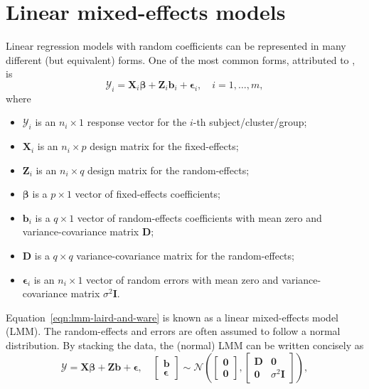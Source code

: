 \documentclass{article}\usepackage[]{graphicx}\usepackage[]{color}
\begin{document}

\section{Linear mixed-effects models}
\label{sec:lmm}

Linear regression models with random coefficients can be represented in many different (but equivalent) forms.  One of the most common forms, attributed to \citet{laird-random-1982}, is
\begin{equation}
\label{eqn:lmm-laird-and-ware}
  \bm{\mathcal{Y}}_i = \bm{X}_i\bm{\beta} + \bm{Z}_i\bm{b}_i + \bm{\epsilon}_i, \quad i = 1, \dotsc, m,
\end{equation}
where
\begin{itemize}
  \item $\bm{\mathcal{Y}}_i$ is an $n_i \times 1$ response vector for the $i$-th subject/cluster/group;
  \item $\bm{X}_i$ is an $n_i \times p$ design matrix for the fixed-effects;
  \item $\bm{Z}_i$ is an $n_i \times q$ design matrix for the random-effects;
  \item $\bm{\beta}$ is a $p \times 1$ vector of fixed-effects coefficients;
  \item $\bm{b}_i$ is a $q \times 1$ vector of random-effects coefficients with mean zero and variance-covariance matrix $\bm{D}$;
  \item $\bm{D}$ is a $q \times q$ variance-covariance matrix for the random-effects;
  \item $\bm{\epsilon}_i$ is an $n_i \times 1$ vector of random errors with mean zero and variance-covariance matrix $\sigma^2\bm{I}$.
\end{itemize}
Equation~\eqref{eqn:lmm-laird-and-ware} is known as a linear mixed-effects model (LMM).  The random-effects and errors are often assumed to follow a normal distribution.  By stacking the data, the (normal) LMM can be written concisely as
\begin{equation}
\label{eqn:lmm-stacked}
    \bm{\mathcal{Y}} = \bm{X}\bm{\beta} + \bm{Z}\bm{b} + \bm{\epsilon}, \quad
      \begin{bmatrix}
        \bm{b} \\
        \bm{\epsilon}
      \end{bmatrix} \sim
      \mathcal{N}\left(\begin{bmatrix}
        \bm{0} \\
        \bm{0}
      \end{bmatrix}, \begin{bmatrix}
        \bm{D} & \bm{0} \\
        \bm{0} & \sigma^2\bm{I}
      \end{bmatrix}\right),
\end{equation}
\end{document}
